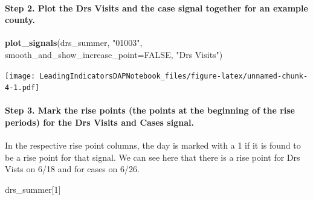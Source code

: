 \documentclass[]{article}
\newenvironment{Shaded}{\begin{snugshade}}{\end{snugshade}}
\newcommand{\DataTypeTok}[1]{\textcolor[rgb]{0.13,0.29,0.53}{#1}}
\newcommand{\DecValTok}[1]{\textcolor[rgb]{0.00,0.00,0.81}{#1}}
\newcommand{\KeywordTok}[1]{\textcolor[rgb]{0.13,0.29,0.53}{\textbf{#1}}}
\newcommand{\NormalTok}[1]{#1}
\newcommand{\OperatorTok}[1]{\textcolor[rgb]{0.81,0.36,0.00}{\textbf{#1}}}
\newcommand{\OtherTok}[1]{\textcolor[rgb]{0.56,0.35,0.01}{#1}}
\newcommand{\StringTok}[1]{\textcolor[rgb]{0.31,0.60,0.02}{#1}}
\let\oldparagraph\paragraph
\renewcommand{\paragraph}[1]{\oldparagraph{#1}\mbox{}}
\begin{document}
\hypertarget{step-2.-plot-the-drs-visits-and-the-case-signal-together-for-an-example-county.}{%
\paragraph{Step 2. Plot the Drs Visits and the case signal together for
an example
county.}\label{step-2.-plot-the-drs-visits-and-the-case-signal-together-for-an-example-county.}}

\begin{Shaded}
\end{Shaded}

\begin{Shaded}
\begin{Highlighting}[]
\KeywordTok{plot_signals}\NormalTok{(drs_summer, }\StringTok{"01003"}\NormalTok{, }\DataTypeTok{smooth_and_show_increase_point=}\OtherTok{FALSE}\NormalTok{, }\StringTok{"Drs Visits"}\NormalTok{)}
\end{Highlighting}
\end{Shaded}

\texttt{[image: LeadingIndicatorsDAPNotebook\_files/figure-latex/unnamed-chunk-4-1.pdf]}

\hypertarget{step-3.-mark-the-rise-points-the-points-at-the-beginning-of-the-rise-periods-for-the-drs-visits-and-cases-signal.}{%
\paragraph{Step 3. Mark the rise points (the points at the beginning of
the rise periods) for the Drs Visits and Cases
signal.}\label{step-3.-mark-the-rise-points-the-points-at-the-beginning-of-the-rise-periods-for-the-drs-visits-and-cases-signal.}}

In the respective rise point columns, the day is marked with a 1 if it
is found to be a rise point for that signal. We can see here that there
is a rise point for Drs Vists on 6/18 and for cases on 6/26.

\begin{Shaded}
\begin{Highlighting}[]
\NormalTok{drs_summer[}\DecValTok{1}\NormalTok{]}
\end{Highlighting}
\end{Shaded}
\end{document}
